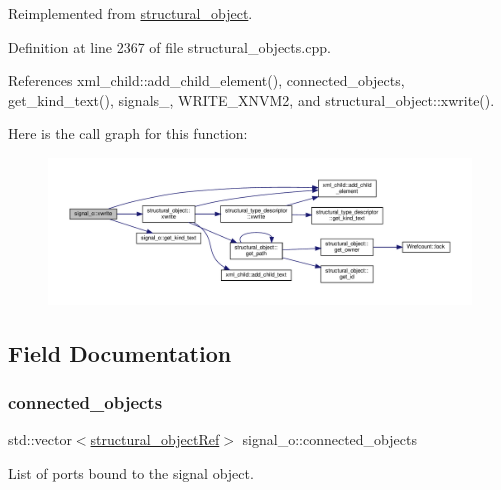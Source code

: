 Reimplemented from \hyperlink{classstructural__object_a7b0b509094451578b2dc10a9b716b16e}{structural\+\_\+object}.



Definition at line 2367 of file structural\+\_\+objects.\+cpp.



References xml\+\_\+child\+::add\+\_\+child\+\_\+element(), connected\+\_\+objects, get\+\_\+kind\+\_\+text(), signals\+\_\+, W\+R\+I\+T\+E\+\_\+\+X\+N\+V\+M2, and structural\+\_\+object\+::xwrite().

Here is the call graph for this function\+:
\nopagebreak
\begin{figure}[H]
\begin{center}
\leavevmode
\includegraphics[width=350pt]{db/d5c/classsignal__o_af828ace28e381c16a88a79b330e2e5b2_cgraph}
\end{center}
\end{figure}


\subsection{Field Documentation}
\mbox{\label{classsignal__o_aaae8e7a528334b31655217dab0d36acb}} 
\subsubsection{\texorpdfstring{connected\+\_\+objects}{connected\_objects}}
{\footnotesize\ttfamily std\+::vector$<$\hyperlink{structural__objects_8hpp_a8ea5f8cc50ab8f4c31e2751074ff60b2}{structural\+\_\+object\+Ref}$>$ signal\+\_\+o\+::connected\+\_\+objects\hspace{0.3cm}{\ttfamily [private]}}



List of ports bound to the signal object. 



